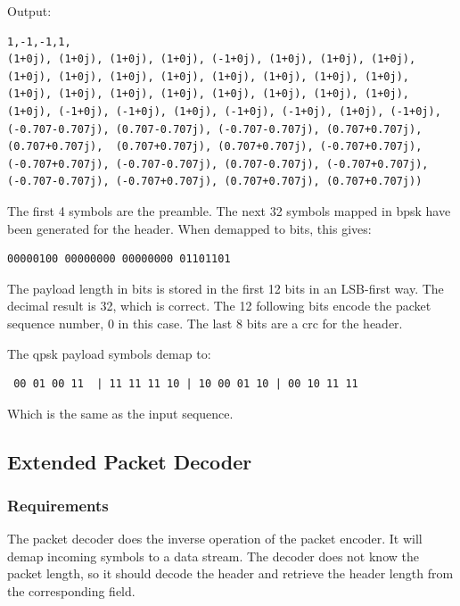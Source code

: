 Output:


\begin{verbatim}
1,-1,-1,1,
(1+0j), (1+0j), (1+0j), (1+0j), (-1+0j), (1+0j), (1+0j), (1+0j),
(1+0j), (1+0j), (1+0j), (1+0j), (1+0j), (1+0j), (1+0j), (1+0j),
(1+0j), (1+0j), (1+0j), (1+0j), (1+0j), (1+0j), (1+0j), (1+0j),
(1+0j), (-1+0j), (-1+0j), (1+0j), (-1+0j), (-1+0j), (1+0j), (-1+0j), 
(-0.707-0.707j), (0.707-0.707j), (-0.707-0.707j), (0.707+0.707j),
(0.707+0.707j),  (0.707+0.707j), (0.707+0.707j), (-0.707+0.707j), 
(-0.707+0.707j), (-0.707-0.707j), (0.707-0.707j), (-0.707+0.707j), 
(-0.707-0.707j), (-0.707+0.707j), (0.707+0.707j), (0.707+0.707j)) 
\end{verbatim}

The first 4 symbols are the preamble. The next 32 symbols mapped in \gls{bpsk} have been generated for the header. When demapped to bits, this gives:
\begin{verbatim}
00000100 00000000 00000000 01101101
\end{verbatim}

The payload length in bits is stored in the first 12 bits in an LSB-first way. The decimal result is 32, which is correct. The 12 following bits encode the packet sequence number, 0 in this case. The last 8 bits are a \gls{crc} for the header.
\medskip

The \gls{qpsk} payload symbols demap to:
\begin{verbatim}
 00 01 00 11  | 11 11 11 10 | 10 00 01 10 | 00 10 11 11
\end{verbatim}
Which is the same as the input sequence.










\newpage

\subsection{Extended Packet Decoder}
\subsubsection{Requirements}
The packet decoder does the inverse operation of the packet encoder. It will demap incoming symbols to a data stream. The decoder does not know the packet length, so it should decode the header and retrieve the header length from the corresponding field. \medskip

